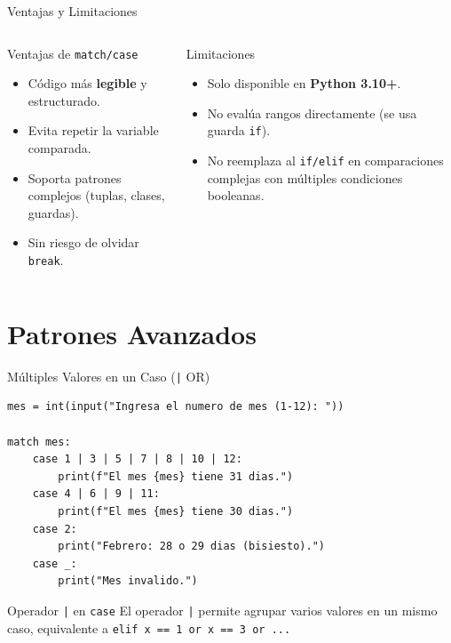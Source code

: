 \documentclass[aspectratio=169,xcolor=dvipsnames]{beamer}
\begin{document}
\begin{frame}{Ventajas y Limitaciones}
    \begin{columns}
        \begin{block}{Ventajas de \texttt{match/case}}
            \begin{itemize}
                \item Código más \textbf{legible} y estructurado.
                \item Evita repetir la variable comparada.
                \item Soporta patrones complejos (tuplas, clases, guardas).
                \item Sin riesgo de olvidar \texttt{break}.
            \end{itemize}
        \end{block}

        \begin{alertblock}{Limitaciones}
            \begin{itemize}
                \item Solo disponible en \textbf{Python 3.10+}.
                \item No evalúa rangos directamente (se usa guarda \texttt{if}).
                \item No reemplaza al \texttt{if/elif} en comparaciones complejas con múltiples condiciones booleanas.
            \end{itemize}
        \end{alertblock}
    \end{columns}
\end{frame}

\section{Patrones Avanzados}

\begin{frame}[fragile]{Múltiples Valores en un Caso (\texttt{|} OR)}
\begin{lstlisting}[style=PythonStyle]
mes = int(input("Ingresa el numero de mes (1-12): "))

match mes:
    case 1 | 3 | 5 | 7 | 8 | 10 | 12:
        print(f"El mes {mes} tiene 31 dias.")
    case 4 | 6 | 9 | 11:
        print(f"El mes {mes} tiene 30 dias.")
    case 2:
        print("Febrero: 28 o 29 dias (bisiesto).")
    case _:
        print("Mes invalido.")
\end{lstlisting}

    \begin{block}{Operador \texttt{|} en \texttt{case}}
        El operador \texttt{|} permite agrupar varios valores en un mismo caso, equivalente a \texttt{elif x == 1 or x == 3 or ...}
    \end{block}
\end{frame}
\end{document}
